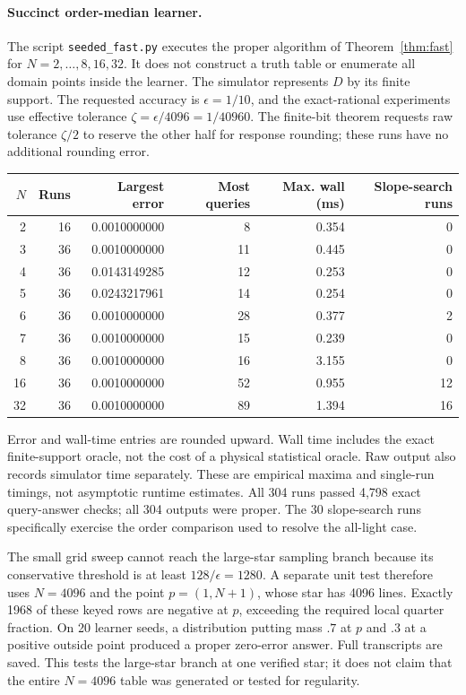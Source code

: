 \paragraph{Succinct order-median learner.}
The script \texttt{seeded\_fast.py} executes the proper algorithm of Theorem~\ref{thm:fast} for $N=2,\ldots,8,16,32$. It does not construct a truth table or enumerate all domain points inside the learner. The simulator represents $D$ by its finite support. The requested accuracy is $\epsilon=1/10$, and the exact-rational experiments use effective tolerance $\zeta=\epsilon/4096=1/40960$. The finite-bit theorem requests raw tolerance $\zeta/2$ to reserve the other half for response rounding; these runs have no additional rounding error.

\begin{center}\small
\begin{tabular}{rrrrrr}
\toprule
$N$&Runs&Largest error&Most queries&Max. wall (ms)&Slope-search runs\\
\midrule
2&16&0.0010000000&8&0.354&0\\
3&36&0.0010000000&11&0.445&0\\
4&36&0.0143149285&12&0.253&0\\
5&36&0.0243217961&14&0.254&0\\
6&36&0.0010000000&28&0.377&2\\
7&36&0.0010000000&15&0.239&0\\
8&36&0.0010000000&16&3.155&0\\
16&36&0.0010000000&52&0.955&12\\
32&36&0.0010000000&89&1.394&16\\
\bottomrule
\end{tabular}
\end{center}
Error and wall-time entries are rounded upward. Wall time includes the exact finite-support oracle, not the cost of a physical statistical oracle. Raw output also records simulator time separately. These are empirical maxima and single-run timings, not asymptotic runtime estimates. All 304 runs passed 4,798 exact query-answer checks; all 304 outputs were proper. The 30 slope-search runs specifically exercise the order comparison used to resolve the all-light case.

The small grid sweep cannot reach the large-star sampling branch because its conservative threshold is at least $128/\epsilon=1280$. A separate unit test therefore uses $N=4096$ and the point $p=(1,N+1)$, whose star has 4096 lines. Exactly 1968 of these keyed rows are negative at $p$, exceeding the required local quarter fraction. On 20 learner seeds, a distribution putting mass $.7$ at $p$ and $.3$ at a positive outside point produced a proper zero-error answer. Full transcripts are saved. This tests the large-star branch at one verified star; it does not claim that the entire $N=4096$ table was generated or tested for regularity.

